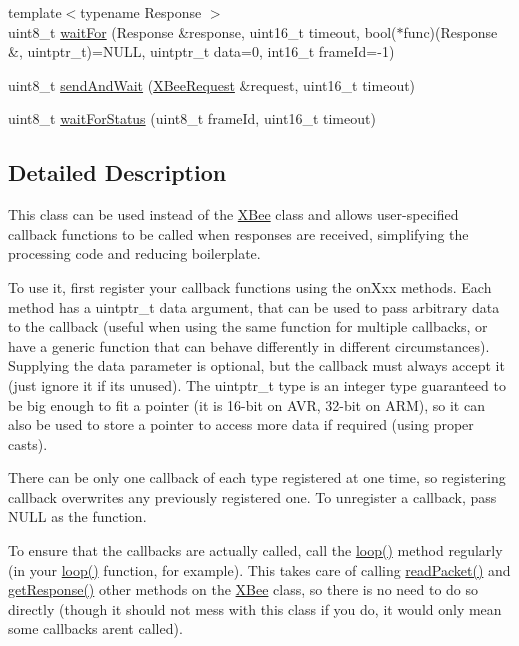 \begin{DoxyCompactItemize}
\item 
{\footnotesize template$<$typename Response $>$ }\\uint8\+\_\+t \hyperlink{class_x_bee_with_callbacks_aca6a7f82b94c3d2dc4353c0a18404da7}{wait\+For} (Response \&response, uint16\+\_\+t timeout, bool($\ast$func)(Response \&, uintptr\+\_\+t)=N\+U\+LL, uintptr\+\_\+t data=0, int16\+\_\+t frame\+Id=-\/1)
\item 
uint8\+\_\+t \hyperlink{class_x_bee_with_callbacks_ab503dbf4de2376d68564ffff9a11d0c5}{send\+And\+Wait} (\hyperlink{class_x_bee_request}{X\+Bee\+Request} \&request, uint16\+\_\+t timeout)
\item 
uint8\+\_\+t \hyperlink{class_x_bee_with_callbacks_acc987ba525278080c3cbe2db1d2ed249}{wait\+For\+Status} (uint8\+\_\+t frame\+Id, uint16\+\_\+t timeout)
\end{DoxyCompactItemize}


\subsection{Detailed Description}
This class can be used instead of the \hyperlink{class_x_bee}{X\+Bee} class and allows user-\/specified callback functions to be called when responses are received, simplifying the processing code and reducing boilerplate.

To use it, first register your callback functions using the on\+Xxx methods. Each method has a uintptr\+\_\+t data argument, that can be used to pass arbitrary data to the callback (useful when using the same function for multiple callbacks, or have a generic function that can behave differently in different circumstances). Supplying the data parameter is optional, but the callback must always accept it (just ignore it if it\textquotesingle{}s unused). The uintptr\+\_\+t type is an integer type guaranteed to be big enough to fit a pointer (it is 16-\/bit on A\+VR, 32-\/bit on A\+RM), so it can also be used to store a pointer to access more data if required (using proper casts).

There can be only one callback of each type registered at one time, so registering callback overwrites any previously registered one. To unregister a callback, pass N\+U\+LL as the function.

To ensure that the callbacks are actually called, call the \hyperlink{class_x_bee_with_callbacks_aec6a4688f09fef714c377ede587b5ba9}{loop()} method regularly (in your \hyperlink{class_x_bee_with_callbacks_aec6a4688f09fef714c377ede587b5ba9}{loop()} function, for example). This takes care of calling \hyperlink{class_x_bee_a7d788232f44e8b3c10dc686a0299fcc6}{read\+Packet()} and \hyperlink{class_x_bee_a18250def80e8b643aa1ccc15a98937f3}{get\+Response()} other methods on the \hyperlink{class_x_bee}{X\+Bee} class, so there is no need to do so directly (though it should not mess with this class if you do, it would only mean some callbacks aren\textquotesingle{}t called).

